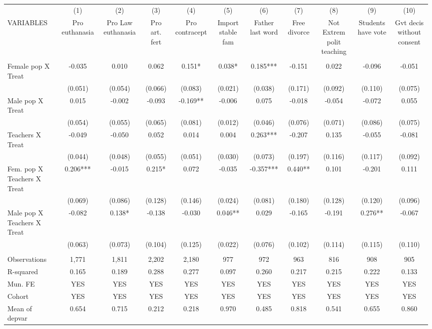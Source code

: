 \begin{tabular}{lcccccccccc} \hline
 & (1) & (2) & (3) & (4) & (5) & (6) & (7) & (8) & (9) & (10) \\
VARIABLES & Pro euthanasia & Pro Law euthanasia & Pro art. fert & Pro contracept & Import stable fam & Father last word & Free divorce & Not Extrem polit teaching & Students have vote & Gvt decis without consent \\ \hline
 &  &  &  &  &  &  &  &  &  &  \\
Female pop X Treat & -0.035 & 0.010 & 0.062 & 0.151* & 0.038* & 0.185*** & -0.151 & 0.022 & -0.096 & -0.051 \\
 & (0.051) & (0.054) & (0.066) & (0.083) & (0.021) & (0.038) & (0.171) & (0.092) & (0.110) & (0.075) \\
Male pop X Treat & 0.015 & -0.002 & -0.093 & -0.169** & -0.006 & 0.075 & -0.018 & -0.054 & -0.072 & 0.055 \\
 & (0.054) & (0.055) & (0.065) & (0.081) & (0.012) & (0.046) & (0.076) & (0.071) & (0.086) & (0.075) \\
Teachers X Treat & -0.049 & -0.050 & 0.052 & 0.014 & 0.004 & 0.263*** & -0.207 & 0.135 & -0.055 & -0.081 \\
 & (0.044) & (0.048) & (0.055) & (0.051) & (0.030) & (0.073) & (0.197) & (0.116) & (0.117) & (0.092) \\
Fem. pop X Teachers X Treat & 0.206*** & -0.015 & 0.215* & 0.072 & -0.035 & -0.357*** & 0.440** & 0.101 & -0.201 & 0.111 \\
 & (0.069) & (0.086) & (0.128) & (0.146) & (0.024) & (0.081) & (0.180) & (0.128) & (0.120) & (0.096) \\
Male pop X Teachers X Treat & -0.082 & 0.138* & -0.138 & -0.030 & 0.046** & 0.029 & -0.165 & -0.191 & 0.276** & -0.067 \\
 & (0.063) & (0.073) & (0.104) & (0.125) & (0.022) & (0.076) & (0.102) & (0.114) & (0.115) & (0.110) \\
 &  &  &  &  &  &  &  &  &  &  \\
Observations & 1,771 & 1,811 & 2,202 & 2,180 & 977 & 972 & 963 & 816 & 908 & 905 \\
R-squared & 0.165 & 0.189 & 0.288 & 0.277 & 0.097 & 0.260 & 0.217 & 0.215 & 0.222 & 0.133 \\
Mun. FE & YES & YES & YES & YES & YES & YES & YES & YES & YES & YES \\
Cohort & YES & YES & YES & YES & YES & YES & YES & YES & YES & YES \\
 Mean of depvar & 0.654 & 0.715 & 0.212 & 0.218 & 0.970 & 0.485 & 0.818 & 0.541 & 0.655 & 0.860 \\ \hline
\end{tabular}
